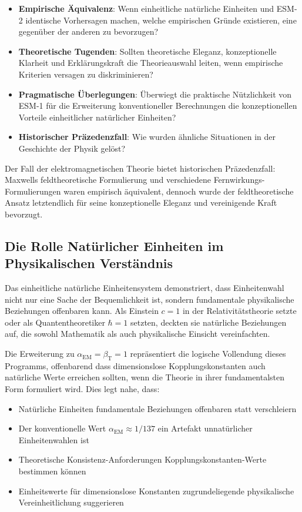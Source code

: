 \documentclass[12pt,a4paper]{article}
\newcommand{\alphaEM}{\alpha_{\text{EM}}}
\newcommand{\betaT}{\beta_{\text{T}}}
\begin{document}
	\begin{itemize}
		\item \textbf{Empirische Äquivalenz}: Wenn einheitliche natürliche Einheiten und ESM-2 identische Vorhersagen machen, welche empirischen Gründe existieren, eine gegenüber der anderen zu bevorzugen?
		\item \textbf{Theoretische Tugenden}: Sollten theoretische Eleganz, konzeptionelle Klarheit und Erklärungskraft die Theorieauswahl leiten, wenn empirische Kriterien versagen zu diskriminieren?
		\item \textbf{Pragmatische Überlegungen}: Überwiegt die praktische Nützlichkeit von ESM-1 für die Erweiterung konventioneller Berechnungen die konzeptionellen Vorteile einheitlicher natürlicher Einheiten?
		\item \textbf{Historischer Präzedenzfall}: Wie wurden ähnliche Situationen in der Geschichte der Physik gelöst?
	\end{itemize}
	
	Der Fall der elektromagnetischen Theorie bietet historischen Präzedenzfall: Maxwells feldtheoretische Formulierung und verschiedene Fernwirkungs-Formulierungen waren empirisch äquivalent, dennoch wurde der feldtheoretische Ansatz letztendlich für seine konzeptionelle Eleganz und vereinigende Kraft bevorzugt.
	
	\subsection{Die Rolle Natürlicher Einheiten im Physikalischen Verständnis}
	\label{subsec:natural_units_understanding}
	
	Das einheitliche natürliche Einheitensystem demonstriert, dass Einheitenwahl nicht nur eine Sache der Bequemlichkeit ist, sondern fundamentale physikalische Beziehungen offenbaren kann. Als Einstein $c = 1$ in der Relativitätstheorie setzte oder als Quantentheoretiker $\hbar = 1$ setzten, deckten sie natürliche Beziehungen auf, die sowohl Mathematik als auch physikalische Einsicht vereinfachten.
	
	Die Erweiterung zu $\alphaEM = \betaT = 1$ repräsentiert die logische Vollendung dieses Programms, offenbarend dass dimensionslose Kopplungskonstanten auch natürliche Werte erreichen sollten, wenn die Theorie in ihrer fundamentalsten Form formuliert wird. Dies legt nahe, dass:
	
	\begin{itemize}
		\item Natürliche Einheiten fundamentale Beziehungen offenbaren statt verschleiern
		\item Der konventionelle Wert $\alphaEM \approx 1/137$ ein Artefakt unnatürlicher Einheitenwahlen ist
		\item Theoretische Konsistenz-Anforderungen Kopplungskonstanten-Werte bestimmen können
		\item Einheitswerte für dimensionslose Konstanten zugrundeliegende physikalische Vereinheitlichung suggerieren
	\end{itemize}
	
\end{document}
